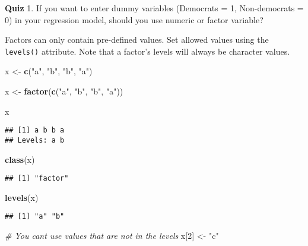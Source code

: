 \documentclass[
]{book}
\newenvironment{Shaded}{\begin{snugshade}}{\end{snugshade}}
\newcommand{\CommentTok}[1]{\textcolor[rgb]{0.56,0.35,0.01}{\textit{#1}}}
\newcommand{\DecValTok}[1]{\textcolor[rgb]{0.00,0.00,0.81}{#1}}
\newcommand{\KeywordTok}[1]{\textcolor[rgb]{0.13,0.29,0.53}{\textbf{#1}}}
\newcommand{\NormalTok}[1]{#1}
\newcommand{\StringTok}[1]{\textcolor[rgb]{0.31,0.60,0.02}{#1}}
\begin{document}
\textbf{Quiz}
1. If you want to enter dummy variables (Democrats = 1, Non-democrats = 0) in your regression model, should you use numeric or factor variable?

Factors can only contain pre-defined values. Set allowed values using the \texttt{levels()} attribute. Note that a factor's levels will always be character values.

\begin{Shaded}
\begin{Highlighting}[]
\NormalTok{x \textless{}{-}}\StringTok{ }\KeywordTok{c}\NormalTok{(}\StringTok{"a"}\NormalTok{, }\StringTok{"b"}\NormalTok{, }\StringTok{"b"}\NormalTok{, }\StringTok{"a"}\NormalTok{)}

\NormalTok{x \textless{}{-}}\StringTok{ }\KeywordTok{factor}\NormalTok{(}\KeywordTok{c}\NormalTok{(}\StringTok{"a"}\NormalTok{, }\StringTok{"b"}\NormalTok{, }\StringTok{"b"}\NormalTok{, }\StringTok{"a"}\NormalTok{))}

\NormalTok{x}
\end{Highlighting}
\end{Shaded}

\begin{verbatim}
## [1] a b b a
## Levels: a b
\end{verbatim}

\begin{Shaded}
\begin{Highlighting}[]
\KeywordTok{class}\NormalTok{(x)}
\end{Highlighting}
\end{Shaded}

\begin{verbatim}
## [1] "factor"
\end{verbatim}

\begin{Shaded}
\begin{Highlighting}[]
\KeywordTok{levels}\NormalTok{(x)}
\end{Highlighting}
\end{Shaded}

\begin{verbatim}
## [1] "a" "b"
\end{verbatim}

\begin{Shaded}
\begin{Highlighting}[]
\CommentTok{\# You can\textquotesingle{}t use values that are not in the levels}
\NormalTok{x[}\DecValTok{2}\NormalTok{] \textless{}{-}}\StringTok{ "c"}
\end{Highlighting}
\end{Shaded}
\end{document}
